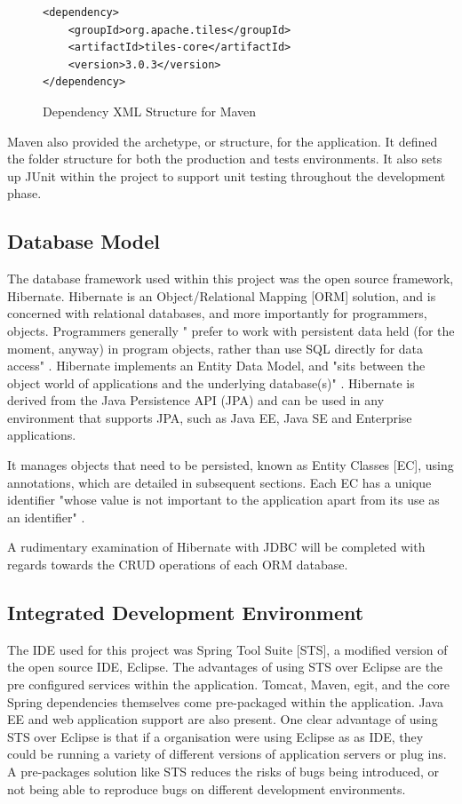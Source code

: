 \begin{figure}[H]
\begin{lstlisting}
<dependency>
	<groupId>org.apache.tiles</groupId>
	<artifactId>tiles-core</artifactId>
	<version>3.0.3</version>
</dependency>
\end{lstlisting}
\caption{Dependency XML Structure for Maven}
\end{figure}

Maven also provided the archetype, or structure, for the application. It defined the folder structure for both the production and tests environments. It also sets up JUnit within the project to support unit testing throughout the development phase.

\subsection{Database Model}

The database framework used within this project was the open source framework, Hibernate. Hibernate is an Object/Relational Mapping [ORM] solution, and is concerned with relational databases, and more importantly for programmers, objects. Programmers generally " prefer to work with persistent data held (for the moment, anyway) in program objects, rather than use SQL directly for data access" \parencite{bauer2005hibernate}. Hibernate implements an Entity Data Model, and "sits between the object world of applications and the underlying database(s)" \parencite{bauer2005hibernate}. Hibernate is derived from the Java Persistence API (JPA) and can be used in any environment that supports JPA, such as Java EE, Java SE and Enterprise applications.

It manages objects that need to be persisted, known as Entity Classes [EC], using annotations, which are detailed in subsequent sections. Each EC has a unique identifier "whose value is not important to the application apart from its use as an identifier" \parencite{bauer2005hibernate}. 

A rudimentary examination of Hibernate with JDBC will be completed with regards towards the CRUD operations of each ORM database.

\subsection{Integrated Development Environment}

The IDE used for this project was Spring Tool Suite [STS], a modified version of the open source IDE, Eclipse. The advantages of using STS over Eclipse are the pre configured services within the application. Tomcat, Maven, egit, and the core Spring dependencies themselves come pre-packaged within the application. Java EE and web application support are also present. One clear advantage of using STS over Eclipse is that if a organisation were using Eclipse as as IDE, they could be running a variety of different versions of application servers or plug ins. A pre-packages solution like STS reduces the risks of bugs being introduced, or not being able to reproduce bugs on different development environments.

